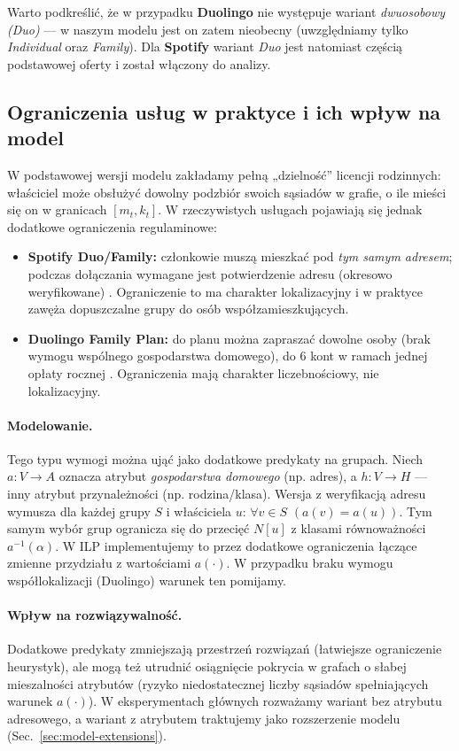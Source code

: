 Warto podkreślić, że w przypadku \textbf{Duolingo} nie występuje wariant \emph{dwuosobowy (Duo)} — w naszym modelu jest on zatem nieobecny (uwzględniamy tylko \emph{Individual} oraz \emph{Family}). Dla \textbf{Spotify} wariant \emph{Duo} jest natomiast częścią podstawowej oferty i został włączony do analizy.

\subsection{Ograniczenia usług w praktyce i ich wpływ na model}
\label{sec:service-constraints}
W podstawowej wersji modelu zakładamy pełną „dzielność” licencji rodzinnych: właściciel może obsłużyć dowolny podzbiór swoich sąsiadów w grafie, o ile mieści się on w granicach \([m_t, k_t]\). W rzeczywistych usługach pojawiają się jednak dodatkowe ograniczenia regulaminowe:
\begin{itemize}
  \item \textbf{Spotify Duo/Family:} członkowie muszą mieszkać pod \emph{tym samym adresem}; podczas dołączania wymagane jest potwierdzenie adresu (okresowo weryfikowane) \cite{spotify_duo_legal,spotify_us_pricing_2025}. Ograniczenie to ma charakter lokalizacyjny i w praktyce zawęża dopuszczalne grupy do osób współzamieszkujących.
  \item \textbf{Duolingo Family Plan:} do planu można zapraszać dowolne osoby (brak wymogu wspólnego gospodarstwa domowego), do 6 kont w ramach jednej opłaty rocznej \cite{duolingo_family_blog}. Ograniczenia mają charakter liczebnościowy, nie lokalizacyjny.
\end{itemize}

\paragraph{Modelowanie.} Tego typu wymogi można ująć jako dodatkowe predykaty na grupach. Niech \(a:V\to A\) oznacza atrybut \emph{gospodarstwa domowego} (np. adres), a \(h:V\to H\) — inny atrybut przynależności (np. rodzina/klasa). Wersja z weryfikacją adresu wymusza dla każdej grupy \(S\) i właściciela \(u\): \(\forall v\in S\,\,(a(v)=a(u))\). Tym samym wybór grup ogranicza się do przecięć \(N[u]\) z klasami równoważności \(a^{-1}(\alpha)\). W ILP implementujemy to przez dodatkowe ograniczenia łączące zmienne przydziału z wartościami \(a(\cdot)\). W przypadku braku wymogu współlokalizacji (Duolingo) warunek ten pomijamy.

\paragraph{Wpływ na rozwiązywalność.} Dodatkowe predykaty zmniejszają przestrzeń rozwiązań (łatwiejsze ograniczenie heurystyk), ale mogą też utrudnić osiągnięcie pokrycia w grafach o słabej mieszalności atrybutów (ryzyko niedostatecznej liczby sąsiadów spełniających warunek \(a(\cdot)\)). W eksperymentach głównych rozważamy wariant bez atrybutu adresowego, a wariant z atrybutem traktujemy jako rozszerzenie modelu (Sec.~\ref{sec:model-extensions}).

